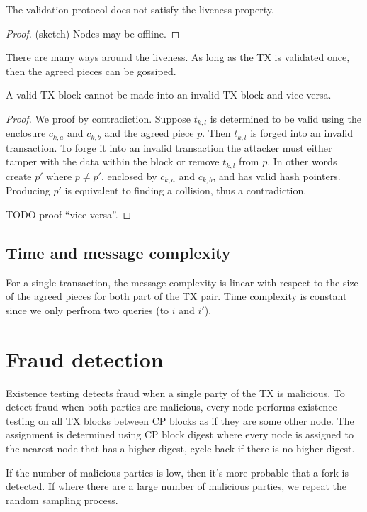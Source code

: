 \begin{lemma}
  The validation protocol does not satisfy the liveness property.
\end{lemma}
\begin{proof}
  (sketch) Nodes may be offline.
\end{proof}

There are many ways around the liveness. As long as the TX is validated once,
then the agreed pieces can be gossiped.

\begin{lemma}
  A valid TX block cannot be made into an invalid TX block and vice versa.
\end{lemma}
\begin{proof}
  We proof by contradiction. Suppose $t_{k, l}$ is determined to be valid using
  the enclosure $c_{k, a}$ and $c_{k, b}$ and the agreed piece $p$. Then $t_{k,
    l}$ is forged into an invalid transaction. To forge it into an invalid
  transaction the attacker must either tamper with the data within the block or
  remove $t_{k, l}$ from $p$. In other words create $p'$ where $p \ne p'$,
  enclosed by $c_{k, a}$ and $c_{k, b}$, and has valid hash pointers. Producing
  $p'$ is equivalent to finding a collision, thus a contradiction.

  TODO proof ``vice versa''.
\end{proof}

\subsection{Time and message complexity}
For a single transaction, the message complexity is linear with respect to the
size of the agreed pieces for both part of the TX pair. Time complexity is
constant since we only perfrom two queries (to $i$ and $i'$).

\section{Fraud detection}
Existence testing detects fraud when a single party of the TX is malicious. To
detect fraud when both parties are malicious, every node performs existence
testing on all TX blocks between CP blocks as if they are some other node. The
assignment is determined using CP block digest where every node is assigned to
the nearest node that has a higher digest, cycle back if there is no higher
digest.

If the number of malicious parties is low, then it's more probable that a fork
is detected. If where there are a large number of malicious parties, we repeat
the random sampling process.


